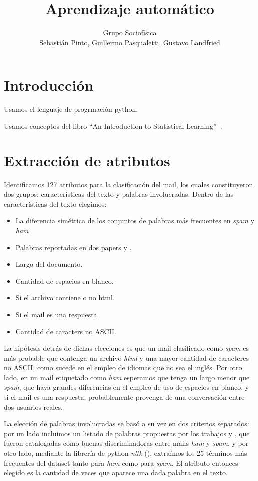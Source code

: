\documentclass[a4paper,10pt]{article}
\title{Aprendizaje autom\'atico}
\author{Grupo Sociof\'isica \\
Sebasti\'an Pinto, Guillermo Pasqualetti, Gustavo Landfried}
\begin{document}
\maketitle

\section{Introducci\'on}

Usamos el lenguaje de progrmaci\'on python. 

Usamos conceptos del libro ``An Introduction to Statistical Learning''~\cite{james_hastie_tibshirani}.

\section{Extracci\'on de atributos}

\par Identificamos 127 atributos para la clasificación del mail, los cuales constituyeron dos grupos: características del texto y palabras involucradas. Dentro de las características del texto elegimos:
\begin{itemize}
\item La diferencia sim\'etrica de los conjuntos de palabras m\'as frecuentes en \emph{spam} y \emph{ham}
\item Palabras reportadas en dos papers \cite{Gunal} y \cite{Vaughan}. 
\item Largo del documento.
\item Cantidad de espacios en blanco.
\item Si el archivo contiene o no html.
\item Si el mail es una respuesta.
\item Cantidad de caracters no ASCII.
\end{itemize}
La hipótesis detrás de dichas elecciones es que un mail clasificado como \emph{spam} es más probable que contenga un archivo \emph{html} y una mayor cantidad de caracteres no ASCII, como sucede en el empleo de idiomas que no sea el inglés. Por otro lado, en un mail etiquetado como \emph{ham} esperamos que tenga un largo menor que \emph{spam}, que haya grandes diferencias en el empleo de uso de espacios en blanco, y si el mail es una respuesta, probablemente provenga de una conversación entre dos usuarios reales.
\par La elección de palabras involucradas se basó a su vez en dos criterios separados: por un lado incluimos un listado de palabras propuestas por los trabajos \cite{Gunal} y \cite{Vaughan}, que fueron catalogadas como buenas discriminadoras entre mails \emph{ham} y \emph{spam}, y por otro lado, mediante la librería de python \emph{nltk} (\cite{nltk}), extraímos los 25 términos más frecuentes del dataset tanto para \emph{ham} como para \emph{spam}. El atributo entonces elegido es la cantidad de veces que aparece una dada palabra en el texto.
\end{document}
